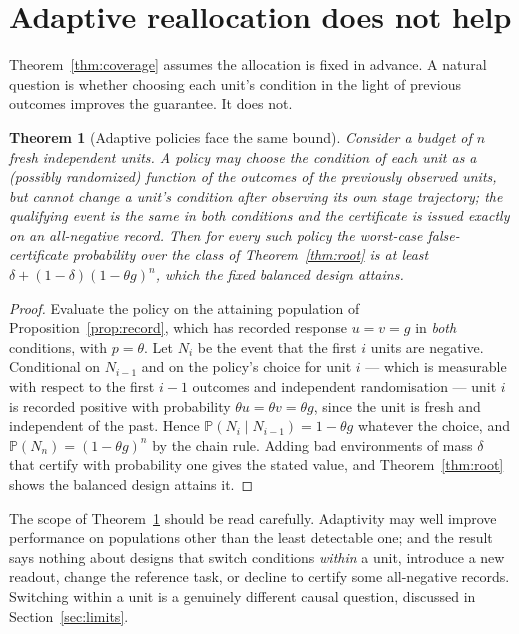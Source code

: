 \documentclass[11pt]{article}
\newtheorem{theorem}{Theorem}[section]
\theoremstyle{definition}
\theoremstyle{remark}
\newcommand{\Prob}{\mathbb{P}}
\begin{document}
\section{Adaptive reallocation does not help}\label{sec:adaptive}

Theorem~\ref{thm:coverage} assumes the allocation is fixed in advance. A natural
question is whether choosing each unit's condition in the light of previous
outcomes improves the guarantee. It does not.

\begin{theorem}[Adaptive policies face the same bound]\label{thm:adaptive}
Consider a budget of $n$ fresh independent units. A policy may choose the
condition of each unit as a (possibly randomized) function of the outcomes of the
previously observed units, but cannot change a unit's condition after observing
its own stage trajectory; the qualifying event is the same in both conditions and
the certificate is issued exactly on an all-negative record. Then for every such
policy the worst-case false-certificate probability over the class of
Theorem~\ref{thm:root} is at least $\delta+(1-\delta)(1-\theta g)^n$, which the
fixed balanced design attains.
\end{theorem}

\begin{proof}
Evaluate the policy on the attaining population of
Proposition~\ref{prop:record}, which has recorded response $u=v=g$ in
\emph{both} conditions, with $p=\theta$. Let $N_i$ be the event that the first
$i$ units are negative. Conditional on $N_{i-1}$ and on the policy's choice for
unit $i$ --- which is measurable with respect to the first $i-1$ outcomes and
independent randomisation --- unit $i$ is recorded positive with probability
$\theta u=\theta v=\theta g$, since the unit is fresh and independent of the
past. Hence $\Prob(N_i\mid N_{i-1})=1-\theta g$ whatever the choice, and
$\Prob(N_n)=(1-\theta g)^n$ by the chain rule. Adding bad environments of mass
$\delta$ that certify with probability one gives the stated value, and
Theorem~\ref{thm:root} shows the balanced design attains it.
\end{proof}

The scope of Theorem~\ref{thm:adaptive} should be read carefully. Adaptivity may
well improve performance on populations other than the least detectable one; and
the result says nothing about designs that switch conditions \emph{within} a
unit, introduce a new readout, change the reference task, or decline to certify
some all-negative records. Switching within a unit is a genuinely different
causal question, discussed in Section~\ref{sec:limits}.
\end{document}
